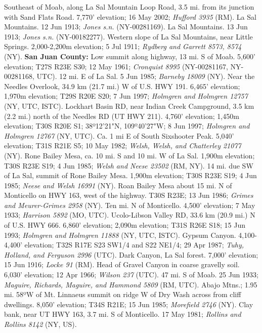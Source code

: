 Southeast of Moab, along La Sal Mountain Loop Road, 3.5 mi. from its junction
with Sand Flats Road. 7,770' elevation; 16 May 2002; \textit{Hufford 3935} (RM).
La Sal Mountains. 12 Jun 1913; \textit{Jones s.n.} (NY-00281169).
La Sal Mountains. 13 Jun 1913; \textit{Jones s.n.} (NY-00182277).
Western slope of La Sal Mountains, near Little Springs. 2,000-2,200m elevation;
5 Jul 1911; \textit{Rydberg and Garrett 8573, 8574} (NY).
  \textbf{San Juan County:}
Low summit along highway, 13 mi. S of Moab.
5,600' elevation; T27S R23E S30; 12 May 1961;
\textit{Cronquist 8995} (NY-00281167, NY-00281168, UTC).
12 mi. E of La Sal. 5 Jun 1985; \textit{Barneby 18009} (NY).
Near the Needles Overlook, 34.9 km (21.7 mi.) W of U.S. HWY 191.
6,465' elevation; 1,970m elevation; T29S R20E S20; 7 Jun 1997;
\textit{Holmgren and Holmgren 12757} (NY, UTC, ISTC).
Lockhart Basin RD, near Indian Creek Campground, 3.5 km (2.2 mi.) north of
the Needles RD (UT HWY 211). 4,760' elevation; 1,450m elevation;
T30S R20E S1; 38º12'21"N, 109º40'27"W; 8 Jun 1997;
\textit{Holmgren and Holmgren 12767} (NY, UTC).
Ca. 1 mi E of South Sixshooter Peak. 5,040' elevation; T31S R21E S5;
10 May 1982; \textit{Welsh, Welsh, and Chatterley 21077} (NY).
Rone Bailey Mesa, ca. 10 mi. S and 10 mi. W of La Sal. 1,900m elevation;
T30S R23E S19; 4 Jun 1985; \textit{Welsh and Neese 23502} (RM, NY).
14 mi. due SW of La Sal, summit of Rone Bailey Mesa. 1,900m elevation;
T30S R23E S19; 4 Jun 1985; \textit{Neese and Welsh 16991} (NY).
Roan Bailey Mesa about 15 mi. N of Monticello on HWY 163, west of the highway.
T30S R23E; 13 Jun 1986; \textit{Grimes and Meurer-Grimes 2958} (NY).
Ten mi. N of Monticello. 4,500' elevation; 7 May 1933;
\textit{Harrison 5892} (MO, UTC).
Ucolo-Libson Valley RD, 33.6 km (20.9 mi.) N of U.S. HWY 666.
6,860' elevation; 2,090m elevation; T31S R26E S18; 15 Jun 1993;
\textit{Holmgren and Holmgren 11888} (NY, UTC, ISTC).
Gypsum Canyon. 4,100-4,400' elevation; T32S R17E S23 SW1/4 and S22 NE1/4;
29 Apr 1987; \textit{Tuhy, Holland, and Ferguson 2996} (UTC).
Dark Canyon, La Sal forest. 7,000' elevation; 15 Jun 1916;
\textit{Locke 91} (RM).
Head of Gravel Canyon in coarse gravelly soil. 6,030' elevation; 12 Apr 1966;
\textit{Wilson 237} (UTC).
47 mi. S of Moab. 25 Jun 1933;
\textit{Maguire, Richards, Maguire, and Hammond 5809} (RM, UTC).
Abajo Mtns.; 1.95 mi. 58ºW of Mt. Linnaeus summit on ridge W of Dry Wash across
from cliff dwellings. 8,050' elevation; T34S R21E; 15 Jun 1985;
\textit{Morefield 2746} (NY).
Clay bank, near UT HWY 163, 3.7 mi. S of Monticello. 17 May 1981;
\textit{Rollins and Rollins 8142} (NY, US).
